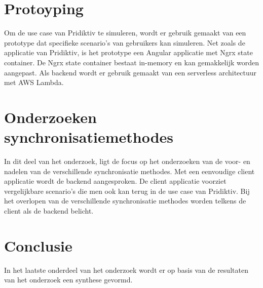 \section{Protoyping}
Om de use case van Pridiktiv te simuleren, wordt er gebruik gemaakt van een prototype dat specifieke scenario's van gebruikers kan simuleren. Net zoals de applicatie van Pridiktiv, is het prototype een Angular applicatie met Ngrx state container. De Ngrx state container bestaat in-memory en kan gemakkelijk worden aangepast. Als backend wordt er gebruik gemaakt van een serverless architectuur met AWS Lambda.
\section{Onderzoeken synchronisatiemethodes}
In dit deel van het onderzoek, ligt de focus op het onderzoeken van de voor- en nadelen van de verschillende synchronisatie methodes. Met een eenvoudige client applicatie wordt de backend aangesproken. De client applicatie voorziet vergelijkbare scenario's die men ook kan terug in de use case van Pridiktiv. Bij het overlopen van de verschillende synchronisatie methodes worden telkens de client als de backend belicht.
\section{Conclusie}
In het laatste onderdeel van het onderzoek wordt er op basis van de resultaten van het onderzoek een synthese gevormd.
